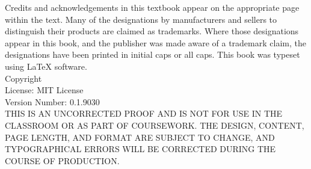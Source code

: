 \documentclass{book}
\makeatletter
\newcommand{\booklicense}{MIT License}
\newcommand{\bookversion}{0.1.9030}
\newcommand{\bookauthor}{\@author}
\makeatother
\begin{document}
\thispagestyle{empty}

\setcounter{page}{1}
\renewcommand{\thepage}{Colophon \arabic{page}}

\begin{flushleft}
\vspace*{\fill}
Credits and acknowledgements in this textbook appear on the appropriate page within the text.
\newline
\newline
Many of the designations by manufacturers and sellers to distinguish their products are claimed as trademarks. Where those designations appear in this book, and the publisher was made aware of a trademark claim, the designations have been printed in initial caps or all caps.
\newline
\newline
This book was typeset using \LaTeX{} software.\\
\vspace{\fill}
Copyright \textcopyright{} \the\year{}  \bookauthor\\
License: \booklicense\\
Version Number: \bookversion\\
\vspace{1cm}
THIS IS AN UNCORRECTED PROOF AND IS NOT FOR USE IN THE CLASSROOM OR AS PART OF COURSEWORK. THE DESIGN, CONTENT, PAGE LENGTH, AND FORMAT ARE SUBJECT TO CHANGE, AND TYPOGRAPHICAL ERRORS WILL BE CORRECTED DURING THE COURSE OF PRODUCTION.
\end{flushleft}

\setcounter{page}{1}
\renewcommand{\thepage}{\roman{page}}



\newpage

\setcounter{page}{1}
\renewcommand{\thepage}{TOC \roman{page}}
\setcounter{tocdepth}{3}
\tableofcontents

\mainmatter

\setcounter{page}{9}
\renewcommand{\thepage}{\arabic{page}}








\end{document}
